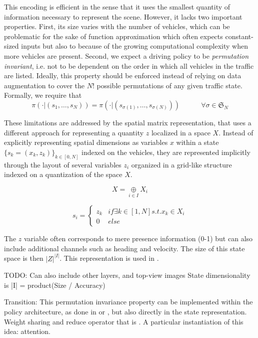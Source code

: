 \documentclass{article}
\begin{document}
{This encoding is efficient in the sense that it uses the smallest quantity of information necessary to represent the scene. However, it lacks two important properties. First, its size varies with the number of vehicles, which can be problematic for the sake of function approximation which often expects constant-sized inputs but also to because of the growing computational complexity when more vehicles are present. Second, we expect a driving policy to be \emph{permutation invariant}, i.e. not to be dependent on the order in which all vehicles in the traffic are listed. Ideally, this property should be enforced instead of relying on data augmentation to cover the $N!$ possible permutations of any given traffic state. Formally, we require that 
\begin{equation}
\pi(\cdot|(s_1,\dotsc,s_N)) = \pi(\cdot|(s_{\sigma(1)},\dotsc,s_{\sigma(N)})) \quad\quad\quad \forall\sigma \in \mathfrak{S}_N
\end{equation}

These limitations are addressed by the spatial matrix representation, that uses a different approach for representing a quantity $z$ localized in a space $X$. Instead of explicitly representing spatial dimensions as variables $x$ within a state $\{s_k=(x_k,z_k)\}_{k\in[0,N]}$ indexed on the vehicles, they are represented implicitly through the layout of several variables $z_i$ organized in a grid-like structure indexed on a quantization of the space $X$.

\begin{equation}
X = \underset{i\in I}{\oplus} X_i
\end{equation}

\begin{equation}
s_{i} = \begin{cases}
z_k & if \exists k\in[1,N] s.t. x_k \in X_i \\
0 & else
\end{cases}
\end{equation}

The $z$ variable often corresponds to mere presence information (0-1) but can also include additional channels such as heading and velocity.
The size of this state space is then $|Z|^{|I|}$.
This representation is used in \citep{Mukadam2018, Isele2017, Fridman2018}.

TODO: Can also include other layers, and top-view images
State dimensionality is |I| = product(Size / Accuracy)

Transition:
This permutation invariance property can be implemented within the policy architecture, as done in \citep{Chen2017} or \citep{Qi2016}, but also directly in the state representation.
Weight sharing and reduce operator that is \citep{Socially aware, point_net}.
A particular instantiation of this idea: attention.


}
\end{document}
